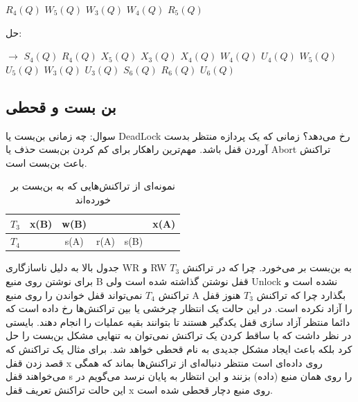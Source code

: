 \documentclass[a4paper]{article}
\begin{document}
\begin{LTR}
    $R_{4}(Q)$ $W_{5}(Q)$ $W_{3}(Q)$ $W_{4}(Q)$ $R_{5}(Q)$
\end{LTR}

حل:

\begin{LTR}
    \centering
    $\rightarrow$ 
    $S_{4}(Q)$ $R_{4}(Q)$ 
    $X_{5}(Q)$ $X_{3}(Q)$
    $X_{4}(Q)$ $W_{4}(Q)$ $U_{4}(Q)$
    $W_{5}(Q)$ $U_{5}(Q)$
    $W_{3}(Q)$ $U_{3}(Q)$
    $S_{6}(Q)$ $R_{6}(Q)$ $U_{6}(Q)$
\end{LTR}

\newpage

\subsection{بن بست و قحطی}

سوال: چه زمانی بن‌بست یا DeadLock رخ می‌دهد؟ زمانی که یک پردازه منتظر بدست آوردن
قفل باشد. مهم‌ترین راهکار برای کم کردن بن‌بست حذف یا Abort تراکنش باعث بن‌بست
است.

\begin{LTR}
    \begin{table}[h]
        \begin{RTL}
            \caption{نمونه‌ای از تراکنش‌هایی که به بن‌بست بر خورده‌اند}
        \end{RTL}
        \centering
            \begin{tabular}{c|c|c|c|c|c}
                $T_{3}$ & x(B) & w(B) & & & x(A) \\ \hline
                $T_{4}$ & & s(A) & r(A) & s(B) & \\
            \end{tabular}
    \end{table}
\end{LTR}

جدول بالا به دلیل ناسازگاری WR و RW به بن‌بست بر می‌خورد. چرا که در تراکنش
$T_{3}$ برای نوشتن روی منبع B قفل نوشتن گذاشته شده است ولی Unlock نشده است و
تراکنش $T_{4}$ نمی‌تواند قفل خواندن را روی منبع A بگذارد چرا که تراکنش $T_{3}$
هنوز قفل را آزاد نکرده است. در این حالت یک انتظار چرخشی یا 
بین تراکنش‌ها رخ داده است که دائما منتظر آزاد سازی قفل یکدگیر هستند تا بتوانند
بقیه عملیات را انجام دهند. بایستی در نظر داشت که با ساقط کردن یک تراکنش نمی‌توان
به تنهایی مشکل بن‌بست را حل کرد بلکه باعث ایجاد مشکل جدیدی به نام قحطی خواهد شد.
برای مثال یک تراکنش که قصد زدن قفل x روی داده‌ای است منتظر دنباله‌ای از
تراکنش‌ها بماند که همگی می‌خواهند قفل s را روی همان منبع (داده) بزنند و این
انتظار به پایان نرسد می‌گویم در این حالت تراکنش تعریف قفل x روی منبع دچار قحطی
شده است.
\end{document}
